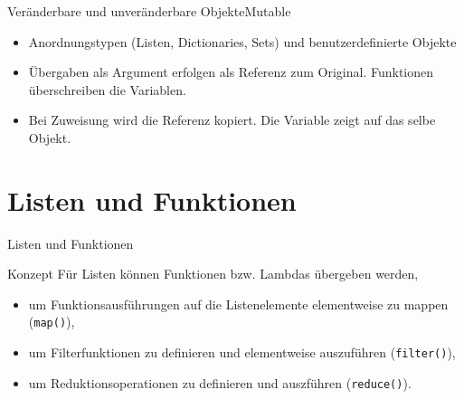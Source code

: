 \documentclass[xelatex,aspectratio=169]{beamer}
\begin{document}
\begin{frame}{Veränderbare und unveränderbare Objekte}{Mutable}
    \begin{itemize}
        \item Anordnungstypen (Listen, Dictionaries, Sets) und benutzerdefinierte Objekte
        \item Übergaben als Argument erfolgen als Referenz zum Original. Funktionen überschreiben die Variablen.
        \item Bei Zuweisung wird die Referenz kopiert. Die Variable zeigt auf das selbe Objekt.
    \end{itemize}
\end{frame}

\section{Listen und Funktionen}

\begin{frame}{Listen und Funktionen}
    \begin{block}{Konzept}
        Für Listen können Funktionen bzw. Lambdas übergeben werden,
        \begin{itemize}
            \item um Funktionsausführungen auf die Listenelemente elementweise zu mappen (\texttt{map()}),
            \item um Filterfunktionen zu definieren und elementweise auszuführen (\texttt{filter()}),
            \item um Reduktionsoperationen zu definieren und auszführen (\texttt{reduce()}).
        \end{itemize}
    \end{block}
\end{frame}
\end{document}

